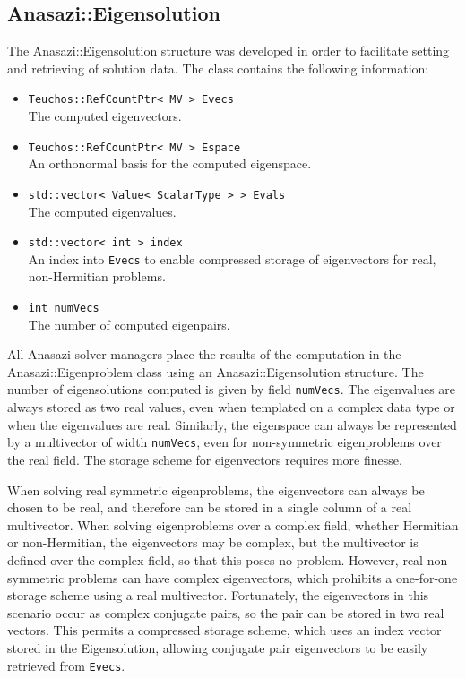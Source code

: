 \subsection{Anasazi::Eigensolution}
\label{sec:anasazi:eigensolution}

The Anasazi::Eigensolution structure was developed in order to facilitate setting
and retrieving of solution data. The class contains the following information:
\begin{itemize}
  \item \verb!Teuchos::RefCountPtr< MV > Evecs! \\ 
   The computed eigenvectors.
 \item \verb!Teuchos::RefCountPtr< MV > Espace! \\ 
   An orthonormal basis for the computed eigenspace.
 \item \verb!std::vector< Value< ScalarType > > Evals! \\ 
   The computed eigenvalues.
 \item \verb!std::vector< int > index! \\ 
   An index into \verb!Evecs! to enable compressed storage of eigenvectors for real, non-Hermitian problems.
 \item \verb!int numVecs! \\
   The number of computed eigenpairs.
\end{itemize}

All Anasazi solver managers place the results of the computation in the
Anasazi::Eigenproblem class using an Anasazi::Eigensolution structure. The number of
eigensolutions computed is given by field \verb!numVecs!. The eigenvalues are
always stored as two real values, even when templated on a complex data type or when the eigenvalues
are real. Similarly, the eigenspace can always be represented by a multivector of width
\verb!numVecs!, even for non-symmetric eigenproblems over the real field. The storage
scheme for eigenvectors requires more finesse.

When solving real symmetric eigenproblems, the eigenvectors can always be chosen to be
real, and therefore can be stored in a single column of a real multivector. When solving
eigenproblems over a complex field, whether Hermitian or non-Hermitian, the eigenvectors
may be complex, but the multivector is defined over the complex field, so that this poses
no problem. However, real non-symmetric problems can have complex eigenvectors, which
prohibits a one-for-one storage scheme using a real multivector.  Fortunately, the
eigenvectors in this scenario occur as complex conjugate pairs, so the pair can be stored
in two real vectors. This permits a compressed storage scheme, which uses an index vector
stored in the Eigensolution, allowing conjugate pair eigenvectors to be easily retrieved
from \verb!Evecs!. 

